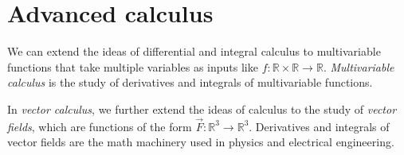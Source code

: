 
\section{Advanced calculus}
\label{sec:advanced_calculus}

	We can extend the ideas of differential and integral calculus
	to multivariable functions that take multiple variables as inputs
	like $f: \mathbb{R} \times \mathbb{R} \to \mathbb{R}$.
	\emph{Multivariable calculus} is the study of derivatives and integrals of multivariable functions.

	In \emph{vector calculus},
	we further extend the ideas of calculus
	to the study of \emph{vector fields},
	which are functions of the form $\vec{F}: \mathbb{R}^3 \to \mathbb{R}^3$.
	Derivatives and integrals of vector fields are the math machinery used in physics
	and electrical engineering.

